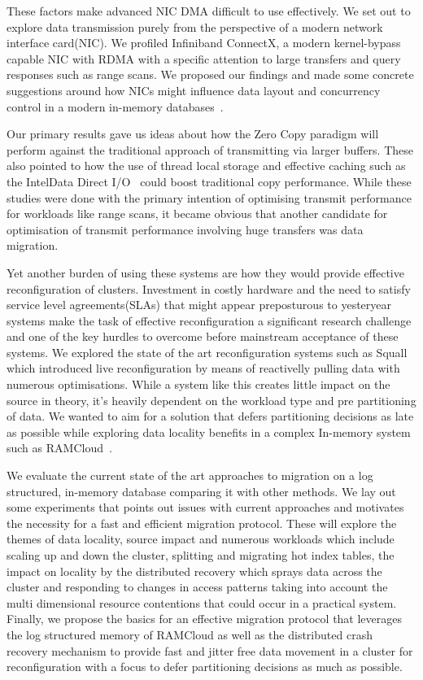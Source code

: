 These factors make advanced NIC DMA difficult to use effectively. We set out to explore data 
transmission purely from the perspective of a modern network interface card(NIC). We profiled
Infiniband ConnectX, a modern kernel-bypass capable NIC
with RDMA with a specific attention to large transfers and query responses such as range scans.
We proposed our findings and made some concrete suggestions around how NICs might
influence data layout and concurrency control in a modern in-memory 
databases~\cite{KesavanRicciStutsman:IMDM16}. 

Our primary results gave us ideas about 
how the Zero Copy paradigm will perform against the traditional approach of transmitting via
larger buffers. These also pointed to how the use of thread local storage and effective caching
such as the Intel\textregistered Data Direct I/O~\cite{ddio} could boost traditional copy performance. 
While these studies were done with the primary intention of optimising transmit performance 
for workloads like range scans, it became obvious that another candidate for optimisation 
of transmit performance involving huge transfers was data migration.

Yet another burden of using these systems are how they would provide effective 
reconfiguration of clusters. Investment in costly hardware and the need to satisfy
service level agreements(SLAs) that might appear preposturous to yesteryear systems
make the task of effective reconfiguration a significant research challenge and 
one of the key hurdles to overcome before mainstream acceptance of these systems.
We explored the state of the art reconfiguration systems such as Squall~\cite{squall} which 
introduced live reconfiguration by means of reactivelly pulling data with numerous optimisations.
While a system like this creates little impact on the source in theory, it's heavily dependent 
on the workload type and pre partitioning of data. We wanted to aim for a solution that defers 
partitioning decisions as late as possible while exploring data locality benefits in a complex
In-memory system such as RAMCloud~\cite{ramcloud}.


We evaluate the current state of the art approaches to migration on a log structured, in-memory database
comparing it with other methods. We lay out some experiments that points out issues with current approaches
and motivates the necessity for a fast and efficient migration protocol. These will explore the themes 
of data locality, source impact and numerous workloads which include scaling up and down the cluster, splitting
and migrating hot index tables, the impact on locality by the distributed recovery which sprays data across the 
cluster and responding to changes in access patterns taking into account the multi dimensional resource contentions
that could occur in a practical system. Finally, we propose the basics for an effective migration protocol that leverages
the log structured memory of RAMCloud as well as the distributed crash recovery mechanism
to provide fast and jitter free data movement in a cluster for reconfiguration with a focus to
defer partitioning decisions as much as possible.

